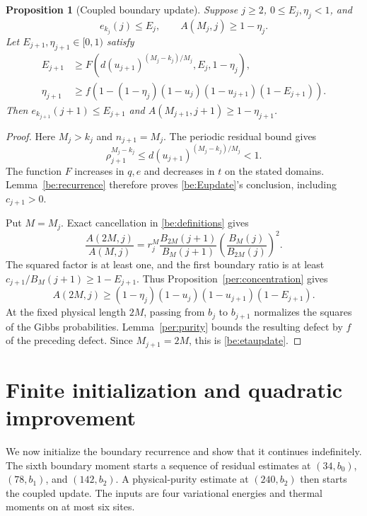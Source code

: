 \documentclass[11pt]{article}
\newtheorem{proposition}[theorem]{Proposition}
\theoremstyle{remark}
\numberwithin{equation}{section}
\begin{document}
\begin{proposition}[Coupled boundary update]\label{be:coupled}
Suppose $j\ge2$, $0\le E_j,\eta_j<1$, and
\[
 e_{k_j}(j)\le E_j,\qquad A(M_j,j)\ge1-\eta_j.
\]
Let $E_{j+1},\eta_{j+1}\in[0,1)$ satisfy
\begin{align}
 E_{j+1}&\ge
 F\left(d(u_{j+1})^{(M_j-k_j)/M_j},E_j,1-\eta_j\right),
                                                   \label{be:Eupdate}\\
 \eta_{j+1}&\ge f\left(1-(1-\eta_j)(1-u_j)(1-u_{j+1})
                                      (1-E_{j+1})\right).
                                                   \label{be:etaupdate}
\end{align}
Then $e_{k_{j+1}}(j+1)\le E_{j+1}$ and
$A(M_{j+1},j+1)\ge1-\eta_{j+1}$.
\end{proposition}
\begin{proof}
Here $M_j>k_j$ and $n_{j+1}=M_j$. The periodic residual bound gives
\[
 \rho_{j+1}^{M_j-k_j}\le d(u_{j+1})^{(M_j-k_j)/M_j}<1.
\]
The function $F$ increases in $q,e$ and decreases in $t$ on the stated
domains. Lemma~\ref{be:recurrence} therefore proves
\eqref{be:Eupdate}'s conclusion, including $c_{j+1}>0$.

Put $M=M_j$. Exact cancellation in \eqref{be:definitions} gives
\begin{equation}\label{be:physical-cancellation}
 \frac{A(2M,j)}{A(M,j)}
 =r_j^M\frac{B_{2M}(j+1)}{B_M(j+1)}
             \left(\frac{B_M(j)}{B_{2M}(j)}\right)^2.
\end{equation}
The squared factor is at least one, and the first boundary ratio is
at least $c_{j+1}/B_M(j+1)\ge1-E_{j+1}$. Thus
Proposition~\ref{per:concentration} gives
\[
 A(2M,j)\ge(1-\eta_j)(1-u_j)(1-u_{j+1})(1-E_{j+1}).
\]
At the fixed physical length $2M$, passing from $b_j$ to $b_{j+1}$
normalizes the squares of the Gibbs probabilities.
Lemma~\ref{per:purity} bounds the resulting defect by $f$ of the
preceding defect. Since $M_{j+1}=2M$, this is
\eqref{be:etaupdate}.
\end{proof}

\section{Finite initialization and quadratic improvement}\label{sec:initialization}
We now initialize the boundary recurrence and show that it continues
indefinitely. The sixth boundary moment starts a sequence of residual
estimates at $(34,b_0)$, $(78,b_1)$, and $(142,b_2)$. A physical-purity
estimate at $(240,b_2)$ then starts the coupled update. The inputs are
four variational energies and thermal moments on at most six sites.
\end{document}
